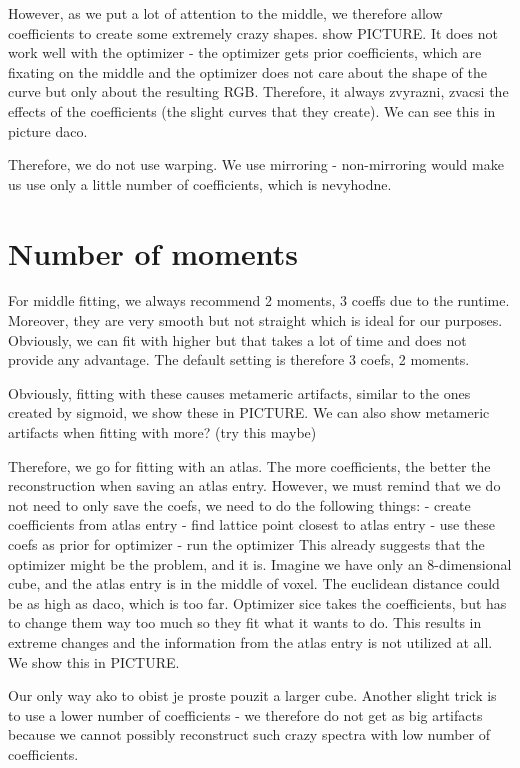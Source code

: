 However, as we put a lot of attention to the middle, we therefore allow coefficients to create some extremely crazy shapes. show PICTURE. It does not work well with the optimizer - the optimizer gets prior coefficients, which are fixating on the middle and the optimizer does not care about the shape of the curve but only about the resulting RGB. Therefore, it always zvyrazni, zvacsi the effects of the coefficients (the slight curves that they create). We can see this in picture daco.

Therefore, we do not use warping. We use mirroring - non-mirroring would make us use only a little number of coefficients, which is nevyhodne. 

\section{Number of moments}

For middle fitting, we always recommend 2 moments, 3 coeffs due to the runtime. Moreover, they are very smooth but not straight which is ideal for our purposes. Obviously, we can fit with higher but that takes a lot of time and does not provide any advantage. The default setting is therefore 3 coefs, 2 moments.

Obviously, fitting with these causes metameric artifacts, similar to the ones created by sigmoid, we show these in PICTURE. We can also show metameric artifacts when fitting with more? (try this maybe)

Therefore, we go for fitting with an atlas. The more coefficients, the better the reconstruction when saving an atlas entry. However, we must remind that we do not need to only save the coefs, we need to do the following things:
- create coefficients from atlas entry
- find lattice point closest to atlas entry
- use these coefs as prior for optimizer
- run the optimizer
This already suggests that the optimizer might be the problem, and it is. Imagine we have only an 8-dimensional cube, and the atlas entry is in the middle of voxel. The euclidean distance could be as high as daco, which is too far. Optimizer sice takes the coefficients, but has to change them way too much so they fit what it wants to do. This results in extreme changes and the information from the atlas entry is not utilized at all. We show this in PICTURE.

Our only way ako to obist je proste pouzit a larger cube. Another slight trick is to use a lower number of coefficients - we therefore do not get as big artifacts because we cannot possibly reconstruct such crazy spectra with low number of coefficients. 

